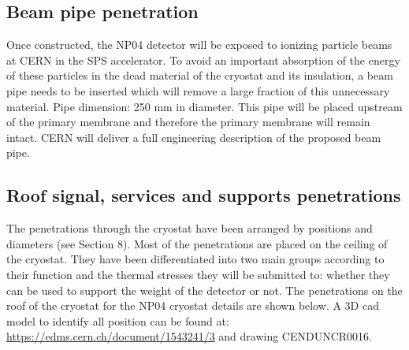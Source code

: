 \subsection{Beam pipe penetration}

Once constructed, the NP04 detector will be exposed to ionizing particle beams at CERN in the SPS accelerator. To avoid an important absorption of the energy of these particles in the dead material of the cryostat and its insulation, a beam pipe needs to be inserted which will remove a large fraction of this unnecessary material. Pipe dimension: 250 mm in diameter. This pipe will be placed upstream of the primary membrane and therefore the primary membrane will remain intact. CERN will deliver a full engineering description of the proposed beam pipe.

\subsection{Roof signal, services and supports penetrations}

The penetrations through the cryostat have been arranged by positions and diameters (see Section 8). Most of the penetrations are placed on the ceiling of the cryostat. They have been differentiated into two main groups according to their function and the thermal stresses they will be submitted to: whether they can be used to support the weight of the detector or not.
The penetrations on the roof of the cryostat for the NP04 cryostat details are shown below.  A 3D cad model to identify all position can be found at:
\url{https://edms.cern.ch/document/1543241/3} and drawing CENDUNCR0016. 


